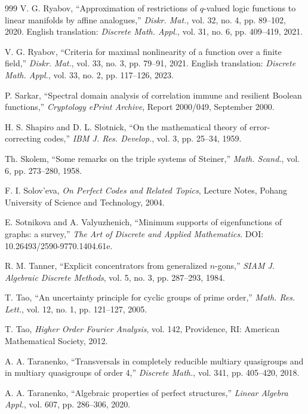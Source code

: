 \documentclass[11pt]{article}
\theoremstyle{definition}
\begin{document}
{{{\begin{thebibliography}{999}
V. G. Ryabov,
``Approximation of restrictions of $q$-valued logic functions to linear manifolds by affine analogues,''
\textit{Diskr. Mat.}, vol. 32, no. 4, pp. 89--102, 2020.
English translation: \textit{Discrete Math. Appl.}, vol. 31, no. 6, pp. 409--419, 2021.

V. G. Ryabov,
``Criteria for maximal nonlinearity of a function over a finite field,''
\textit{Diskr. Mat.}, vol. 33, no. 3, pp. 79--91, 2021.
English translation: \textit{Discrete Math. Appl.}, vol. 33, no. 2, pp. 117--126, 2023.

P. Sarkar,
``Spectral domain analysis of correlation immune and resilient Boolean functions,''
\textit{Cryptology ePrint Archive}, Report 2000/049, September 2000.

H. S. Shapiro and D. L. Slotnick,
``On the mathematical theory of error-correcting codes,''
\textit{IBM J. Res. Develop.}, vol. 3, pp. 25--34, 1959.

Th. Skolem,
``Some remarks on the triple systems of Steiner,''
\textit{Math. Scand.}, vol. 6, pp. 273--280, 1958.

F. I. Solov'eva,
\textit{On Perfect Codes and Related Topics},
Lecture Notes, Pohang University of Science and Technology, 2004.

E. Sotnikova and A. Valyuzhenich,
``Minimum supports of eigenfunctions of graphs: a survey,''
\textit{The Art of Discrete and Applied Mathematics}.
DOI: 10.26493/2590-9770.1404.61e.

R. M. Tanner,
``Explicit concentrators from generalized $n$-gons,''
\textit{SIAM J. Algebraic Discrete Methods}, vol. 5, no. 3, pp. 287--293, 1984.

T. Tao,
``An uncertainty principle for cyclic groups of prime order,''
\textit{Math. Res. Lett.}, vol. 12, no. 1, pp. 121--127, 2005.

T. Tao,
\textit{Higher Order Fourier Analysis},
vol. 142, Providence, RI: American Mathematical Society, 2012.

 A. A. Taranenko, 
 ``Transversals in completely reducible multiary quasigroups
and in multiary quasigroups of order 4,'' 
\textit{Discrete Math.},  vol. 341,  pp. 405--420,  2018. 


A. A. Taranenko,
``Algebraic properties of perfect structures,''
\textit{Linear Algebra Appl.}, vol. 607, pp. 286--306, 2020.


\end{thebibliography}}}}
\end{document}
